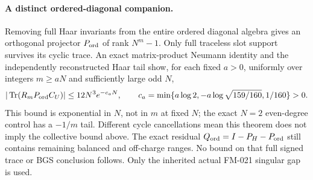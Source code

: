 \paragraph{A distinct ordered-diagonal companion.}
Removing full Haar invariants from the entire ordered diagonal algebra gives
an orthogonal projector $P_{\rm ord}$ of rank $N^m-1$. Only full traceless
slot support survives its cyclic trace. An exact matrix-product Neumann
identity and the independently reconstructed Haar tail show, for each fixed
$a>0$, uniformly over integers $m\ge aN$ and sufficiently large odd $N$,
\[
 |\operatorname{Tr}(R_mP_{\rm ord}C_U)|
 \le12N^3e^{-c_aN},\qquad
 c_a=\min\{a\log2,-a\log\sqrt{159/160},1/160\}>0.
\]
This bound is exponential in $N$, not in $m$ at fixed $N$; the exact
$N=2$ even-degree control has a $-1/m$ tail. Different cycle cancellations
mean this theorem does not imply the collective bound above.
The exact residual $Q_{\rm ord}=I-P_H-P_{\rm ord}$ still contains remaining
balanced and off-charge ranges. No bound on that full signed trace or BGS
conclusion follows. Only the inherited actual FM-021 singular gap is used.
